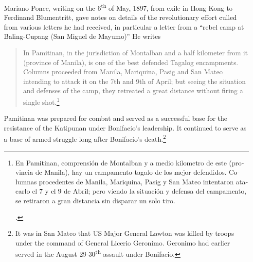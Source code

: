 Mariano Ponce, writing on the 6\textsuperscript{th} of May, 1897, from exile in Hong Kong to Ferdinand Blumentritt, gave notes on details of the revolutionary effort culled from various letters he had received, in particular a letter from a \enquote{rebel camp at Baling-Cupang (San Miguel de Mayumo)} He writes

\begin{quote}
In Pamitinan, in the jurisdiction of Montalban and a half kilometer from it (province of Manila), is one of the best defended Tagalog encampments. Columns proceeded from Manila, Mariquina, Pasig and San Mateo intending to attack it on the 7th and 9th of April; but seeing the situation and defenses of the camp, they retreated a great distance without firing a single shot.\footnote{\begin{otherlanguage}{spanish} En Pamitinan, comprensi\'on de Montalban y a medio kilometro de este (provincia de Manila), hay un campamento tagalo de los mejor defendidos. Columnas procedentes de Manila, Mariquina, Pasig y San Mateo intentaron atacarlo el 7 y el 9 de Abril; pero viendo la situaci\'on y defensa del campamento, se retiraron a gran distancia sin disparar un solo tiro. \end{otherlanguage} \parencite[1-3]{Ponce1932}.}
\end{quote}

Pamitinan was prepared for combat and served as a successful base for the resistance of the Katipunan under Bonifacio's leadership. It continued to serve as a base of armed struggle long after Bonifacio's death.\footnote{It was in San Mateo that US Major General Lawton was killed by troops under the command of General Licerio Geronimo. Geronimo had earlier served in the August 29-30\textsuperscript{th} assault under Bonifacio.}
